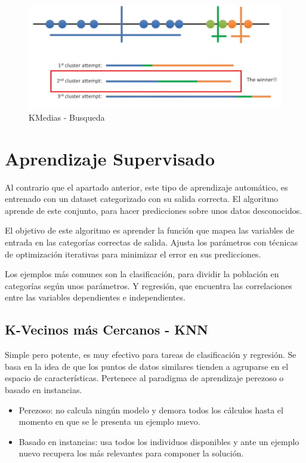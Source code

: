 \begin{figure}[!h]
	\centering
	\includegraphics[width=1\textwidth]{images/chapter_2/kmedias}
	\caption{KMedias - Busqueda}
	\label{fig:kmediasBusqueda}
\end{figure}


\section{Aprendizaje Supervisado}
Al contrario que el apartado anterior, este tipo de aprendizaje automático, es entrenado con un dataset categorizado con su salida correcta. El algoritmo aprende de este conjunto, para hacer predicciones sobre unos datos desconocidos.

El objetivo de este algoritmo es aprender la función que mapea las variables de entrada en las categorías correctas de salida. Ajusta los parámetros con técnicas de optimización iterativas para minimizar el error en sus predicciones.

Los ejemplos más comunes son la clasificación, para dividir la población en categorías según unos parámetros. Y regresión, que encuentra las correlaciones entre las variables dependientes e independientes.\

\newpage

\subsection{K-Vecinos más Cercanos - KNN}

Simple pero potente, es muy efectivo para tareas de clasificación y regresión. Se basa en la idea de que los puntos de datos similares tienden a agruparse en el espacio de características. Pertenece al paradigma de aprendizaje perezoso o basado en instancias.

\begin{itemize}
	\item Perezoso: no calcula ningún modelo y demora todos los cálculos hasta el momento en que se le presenta un ejemplo nuevo.
	
	\item Basado en instancias: usa todos los individuos disponibles y ante un ejemplo nuevo recupera los más relevantes para componer la solución.	
\end{itemize}

